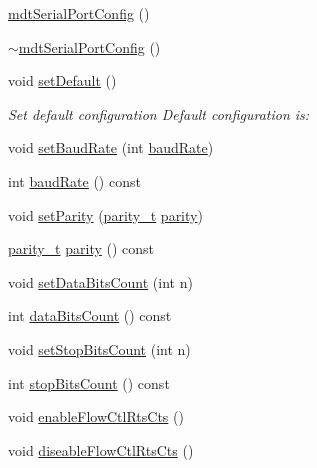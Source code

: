\begin{DoxyCompactItemize}
\item 
\hyperlink{classmdt_serial_port_config_afd66ec4a03804e6a7b9ce33c6eb057d6}{mdt\-Serial\-Port\-Config} ()
\item 
\hyperlink{classmdt_serial_port_config_adfd115a6a82eaddb82abf63c5a49a38b}{$\sim$mdt\-Serial\-Port\-Config} ()
\item 
void \hyperlink{classmdt_serial_port_config_acabcdbda285314992582e5ffd413b555}{set\-Default} ()
\begin{DoxyCompactList}\small\item\em Set default configuration Default configuration is\-: \end{DoxyCompactList}\item 
void \hyperlink{classmdt_serial_port_config_a065f1875abc81e2aadd42a17d50167b1}{set\-Baud\-Rate} (int \hyperlink{classmdt_serial_port_config_a300e3a95bb527cc83fd872c90403b443}{baud\-Rate})
\item 
int \hyperlink{classmdt_serial_port_config_a300e3a95bb527cc83fd872c90403b443}{baud\-Rate} () const 
\item 
void \hyperlink{classmdt_serial_port_config_a1bc858db75808c23d1233244cff8d4fc}{set\-Parity} (\hyperlink{classmdt_serial_port_config_a4b9e444637cf0193a125fabdd67d8bfe}{parity\-\_\-t} \hyperlink{classmdt_serial_port_config_a5bde62d17669a712e6a1cd149a76dcea}{parity})
\item 
\hyperlink{classmdt_serial_port_config_a4b9e444637cf0193a125fabdd67d8bfe}{parity\-\_\-t} \hyperlink{classmdt_serial_port_config_a5bde62d17669a712e6a1cd149a76dcea}{parity} () const 
\item 
void \hyperlink{classmdt_serial_port_config_a71b78f5bea7c9a8eb66376aa4cee4344}{set\-Data\-Bits\-Count} (int n)
\item 
int \hyperlink{classmdt_serial_port_config_abd7ff1cd99d2ae97489386b87638a210}{data\-Bits\-Count} () const 
\item 
void \hyperlink{classmdt_serial_port_config_a3c438a1008386bc8eb56c03786136b73}{set\-Stop\-Bits\-Count} (int n)
\item 
int \hyperlink{classmdt_serial_port_config_a78b9a842c6d4d15bafe4d66d9483e208}{stop\-Bits\-Count} () const 
\item 
void \hyperlink{classmdt_serial_port_config_accac127fab319e881a0461f76a97362c}{enable\-Flow\-Ctl\-Rts\-Cts} ()
\item 
void \hyperlink{classmdt_serial_port_config_a5f0af023613beabc6aeb527b280ae5c2}{diseable\-Flow\-Ctl\-Rts\-Cts} ()

\end{DoxyCompactItemize}
